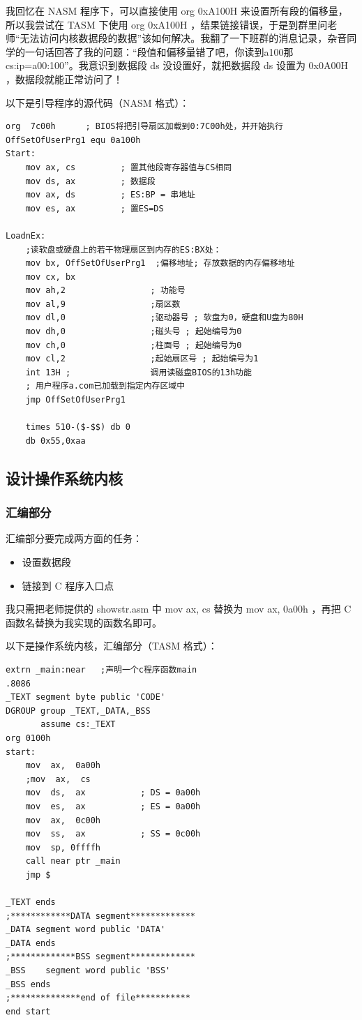 \documentclass{article}
\begin{document}
我回忆在 NASM 程序下，可以直接使用 org 0xA100H 来设置所有段的偏移量，所以我尝试在 TASM 下使用 org 0xA100H ，结果链接错误，于是到群里问老师“无法访问内核数据段的数据”该如何解决。我翻了一下班群的消息记录，杂音同学的一句话回答了我的问题：“段值和偏移量错了吧，你读到a100那cs:ip=a00:100”。我意识到数据段 ds 没设置好，就把数据段 ds 设置为 0x0A00H ，数据段就能正常访问了！

以下是引导程序的源代码（NASM 格式）：

\begin{lstlisting}[language={[x86masm]Assembler}]
org  7c00h		; BIOS将把引导扇区加载到0:7C00h处，并开始执行
OffSetOfUserPrg1 equ 0a100h
Start:
	mov	ax, cs	       ; 置其他段寄存器值与CS相同
	mov	ds, ax	       ; 数据段
	mov	ax, ds		   ; ES:BP = 串地址
	mov	es, ax		   ; 置ES=DS
	
LoadnEx:
	;读软盘或硬盘上的若干物理扇区到内存的ES:BX处：
	mov bx, OffSetOfUserPrg1  ;偏移地址; 存放数据的内存偏移地址
	mov cx, bx
	mov ah,2                 ; 功能号
	mov al,9                 ;扇区数
	mov dl,0                 ;驱动器号 ; 软盘为0，硬盘和U盘为80H
	mov dh,0                 ;磁头号 ; 起始编号为0
	mov ch,0                 ;柱面号 ; 起始编号为0
	mov cl,2                 ;起始扇区号 ; 起始编号为1
	int 13H ;                调用读磁盘BIOS的13h功能
	; 用户程序a.com已加载到指定内存区域中
	jmp OffSetOfUserPrg1
	
	times 510-($-$$) db 0
	db 0x55,0xaa
\end{lstlisting}

\subsection{设计操作系统内核}

\subsubsection{汇编部分}

汇编部分要完成两方面的任务：

\begin{itemize}
\item 设置数据段
\item 链接到 C 程序入口点
\end{itemize}

我只需把老师提供的 showstr.asm 中 mov ax, cs 替换为 mov ax, 0a00h ，再把 C 函数名替换为我实现的函数名即可。

以下是操作系统内核，汇编部分（TASM 格式）：

\begin{lstlisting}[language={[x86masm]Assembler}]
extrn _main:near   ;声明一个c程序函数main
.8086
_TEXT segment byte public 'CODE'
DGROUP group _TEXT,_DATA,_BSS
       assume cs:_TEXT
org 0100h
start:
	mov  ax,  0a00h
	;mov  ax,  cs
	mov  ds,  ax           ; DS = 0a00h
	mov  es,  ax           ; ES = 0a00h
	mov  ax,  0c00h
	mov  ss,  ax           ; SS = 0c00h
	mov  sp, 0ffffh
	call near ptr _main
	jmp $

_TEXT ends
;************DATA segment*************
_DATA segment word public 'DATA'
_DATA ends
;*************BSS segment*************
_BSS	segment word public 'BSS'
_BSS ends
;**************end of file***********
end start
\end{lstlisting}
\end{document}
